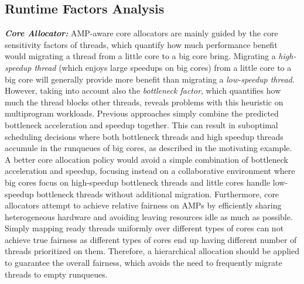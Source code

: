 \subsection{Runtime Factors Analysis}
\textbf{\textit{Core Allocator:}}
AMP-aware core allocators are mainly guided by the core sensitivity factors of threads, which quantify how much performance benefit would migrating a thread from a little core to a big core bring. Migrating a \emph{high-speedup thread} (which enjoys large speedups on big cores) from  a little core to a big core will generally provide more benefit than migrating a \emph{low-speedup thread}. 
However, taking into account also the \emph{bottleneck factor}, which quantifies how much the thread blocks other threads, reveals problems with this heuristic on multiprogram workloads. Previous approaches \cite{jibaja2016portable} simply combine the predicted bottleneck acceleration and speedup together. This can result in suboptimal scheduling decisions where both bottleneck threads and high speedup threads accumule in the runqueues of big cores, as described in the motivating example. A better core allocation policy would avoid a simple combination of bottleneck acceleration and speedup, focusing instead on a collaborative environment where big cores focus on high-speedup bottleneck threads and little cores handle low-speedup bottleneck threads without additional migration.
Furthermore, core allocators attempt to achieve relative fairness on AMPs by efficiently sharing heterogeneous hardware and avoiding leaving resources idle as much as possible. 
Simply mapping ready threads uniformly over different types of cores can not achieve true fairness as different types of cores end up having different number of threads prioritized on them. Therefore, a hierarchical allocation should be applied to guarantee the overall fairness, which avoids the need to frequently migrate threads to empty runqueues. 

